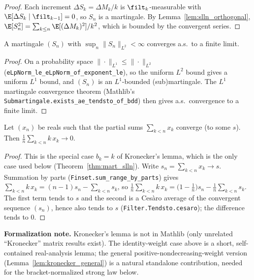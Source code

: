\begin{proof}
Each increment $\Delta S_k = \Delta M_k / k$ is $\filt_k$-measurable with
$\E[\Delta S_k\mid\filt_{k-1}] = 0$, so $S_n$ is a martingale. By
Lemma~\ref{lem:slln_orthogonal}, $\E[S_n^2] = \sum_{k\le n}\E[(\Delta M_k)^2]/k^2$,
which is bounded by the convergent series.
\end{proof}

\begin{lemma}\label{lem:slln_l2_conv}
\leanok
A martingale $(S_n)$ with $\sup_n \|S_n\|_{L^2} < \infty$ converges a.s.\ to a finite limit.
\end{lemma}

\begin{proof}\leanok
On a probability space $\|\cdot\|_{L^1}\le\|\cdot\|_{L^2}$
(\texttt{eLpNorm\_le\_eLpNorm\_of\_exponent\_le}), so the uniform $L^2$ bound gives a uniform
$L^1$ bound, and $(S_n)$ is an $L^1$-bounded (sub)martingale. The $L^1$ martingale convergence
theorem (Mathlib's \texttt{Submartingale.exists\_ae\_tendsto\_of\_bdd}) then gives a.s.\ convergence
to a finite limit.
\end{proof}

\begin{lemma}\label{lem:kronecker}
\leanok
Let $(x_n)$ be reals such that the partial sums $\sum_{k<n} x_k$ converge (to some $s$). Then
$\frac{1}{n}\sum_{k<n} k\,x_k \to 0$.
\end{lemma}

\begin{proof}\leanok
This is the special case $b_k = k$ of Kronecker's lemma, which is the only case used below
(Theorem~\ref{thm:mart_slln}). Write $s_n = \sum_{k<n} x_k \to s$. Summation by parts
(\texttt{Finset.sum\_range\_by\_parts}) gives
$\sum_{k<n} k\,x_k = (n-1)s_n - \sum_{k<n} s_k$, so
$\frac{1}{n}\sum_{k<n} k\,x_k = \big(1-\tfrac1n\big)s_n - \frac{1}{n}\sum_{k<n} s_k$.
The first term tends to $s$ and the second is a Cesàro average of the convergent sequence $(s_n)$,
hence also tends to $s$ (\texttt{Filter.Tendsto.cesaro}); the difference tends to $0$.
\end{proof}

\textbf{Formalization note.} Kronecker's lemma is not in Mathlib (only unrelated
``Kronecker'' matrix results exist). The identity-weight case above is a short, self-contained
real-analysis lemma; the general positive-nondecreasing-weight version
(Lemma~\ref{lem:kronecker_general}) is a natural standalone contribution, needed for the
bracket-normalized strong law below.

